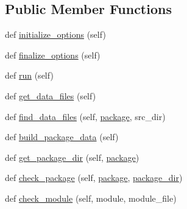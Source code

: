 \subsection*{Public Member Functions}
\begin{DoxyCompactItemize}
\item 
def \hyperlink{classsetuptools_1_1__distutils_1_1command_1_1build__py_1_1build__py_a7ee70bc2446e2e47fddfcb62b1b3e4cc}{initialize\+\_\+options} (self)
\item 
def \hyperlink{classsetuptools_1_1__distutils_1_1command_1_1build__py_1_1build__py_adeb374b79d452731e28fe8c0f1eded68}{finalize\+\_\+options} (self)
\item 
def \hyperlink{classsetuptools_1_1__distutils_1_1command_1_1build__py_1_1build__py_a601d7d2af344082666e61130fb8a1a95}{run} (self)
\item 
def \hyperlink{classsetuptools_1_1__distutils_1_1command_1_1build__py_1_1build__py_a61fa6da3ed68a94092877aca9696d916}{get\+\_\+data\+\_\+files} (self)
\item 
def \hyperlink{classsetuptools_1_1__distutils_1_1command_1_1build__py_1_1build__py_ae0b1fa0973765e98ff2d0f4d56e0e807}{find\+\_\+data\+\_\+files} (self, \hyperlink{classsetuptools_1_1__distutils_1_1command_1_1build__py_1_1build__py_a9166969e65bc8431af32d65df47d6905}{package}, src\+\_\+dir)
\item 
def \hyperlink{classsetuptools_1_1__distutils_1_1command_1_1build__py_1_1build__py_a07aaac20bfe1aed6206a0637ddf92a8b}{build\+\_\+package\+\_\+data} (self)
\item 
def \hyperlink{classsetuptools_1_1__distutils_1_1command_1_1build__py_1_1build__py_a010d6bf7b56b8e6d8abb4d645dbe57a9}{get\+\_\+package\+\_\+dir} (self, \hyperlink{classsetuptools_1_1__distutils_1_1command_1_1build__py_1_1build__py_a9166969e65bc8431af32d65df47d6905}{package})
\item 
def \hyperlink{classsetuptools_1_1__distutils_1_1command_1_1build__py_1_1build__py_ae2f6c1e5373e79dba928af21757c5140}{check\+\_\+package} (self, \hyperlink{classsetuptools_1_1__distutils_1_1command_1_1build__py_1_1build__py_a9166969e65bc8431af32d65df47d6905}{package}, \hyperlink{classsetuptools_1_1__distutils_1_1command_1_1build__py_1_1build__py_ad5e418ba1d8aff7a25bf892ca801c3fa}{package\+\_\+dir})
\item 
def \hyperlink{classsetuptools_1_1__distutils_1_1command_1_1build__py_1_1build__py_afe30dc9e33d58042d0260b8caeee590e}{check\+\_\+module} (self, module, module\+\_\+file)
\item 

\end{DoxyCompactItemize}
